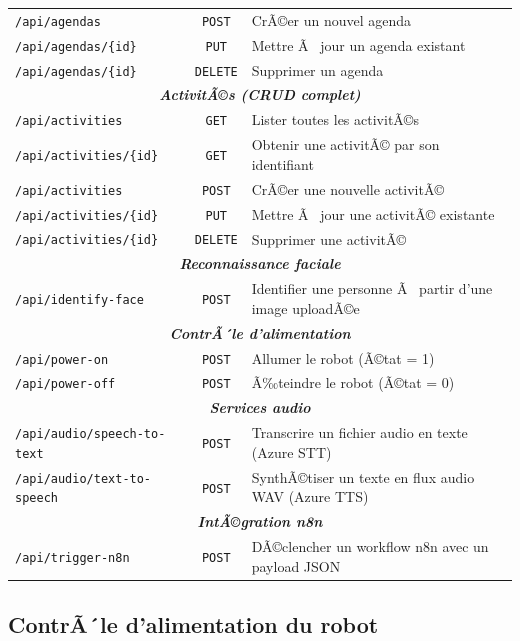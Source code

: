 \begin{table}[H]
\begin{tabular}{|l|c|p{6.5cm}|}
\texttt{/api/agendas} & \texttt{POST}
  & CrÃ©er un nouvel agenda \\
\texttt{/api/agendas/\{id\}} & \texttt{PUT}
  & Mettre Ã  jour un agenda existant \\
\texttt{/api/agendas/\{id\}} & \texttt{DELETE}
  & Supprimer un agenda \\
\hline
\multicolumn{3}{|c|}{\textit{\textbf{ActivitÃ©s (CRUD complet)}}} \\
\hline
\texttt{/api/activities} & \texttt{GET}
  & Lister toutes les activitÃ©s \\
\texttt{/api/activities/\{id\}} & \texttt{GET}
  & Obtenir une activitÃ© par son identifiant \\
\texttt{/api/activities} & \texttt{POST}
  & CrÃ©er une nouvelle activitÃ© \\
\texttt{/api/activities/\{id\}} & \texttt{PUT}
  & Mettre Ã  jour une activitÃ© existante \\
\texttt{/api/activities/\{id\}} & \texttt{DELETE}
  & Supprimer une activitÃ© \\
\hline
\multicolumn{3}{|c|}{\textit{\textbf{Reconnaissance faciale}}} \\
\hline
\texttt{/api/identify-face} & \texttt{POST}
  & Identifier une personne Ã  partir d'une image uploadÃ©e \\
\hline
\multicolumn{3}{|c|}{\textit{\textbf{ContrÃ´le d'alimentation}}} \\
\hline
\texttt{/api/power-on} & \texttt{POST}
  & Allumer le robot (Ã©tat = 1) \\
\texttt{/api/power-off} & \texttt{POST}
  & Ã‰teindre le robot (Ã©tat = 0) \\
\hline
\multicolumn{3}{|c|}{\textit{\textbf{Services audio}}} \\
\hline
\texttt{/api/audio/speech-to-text} & \texttt{POST}
  & Transcrire un fichier audio en texte (Azure STT) \\
\texttt{/api/audio/text-to-speech} & \texttt{POST}
  & SynthÃ©tiser un texte en flux audio WAV (Azure TTS) \\
\hline
\multicolumn{3}{|c|}{\textit{\textbf{IntÃ©gration n8n}}} \\
\hline
\texttt{/api/trigger-n8n} & \texttt{POST}
  & DÃ©clencher un workflow n8n avec un payload JSON \\
\hline
\end{tabular}
\end{table}

\subsection{ContrÃ´le d'alimentation du robot}

